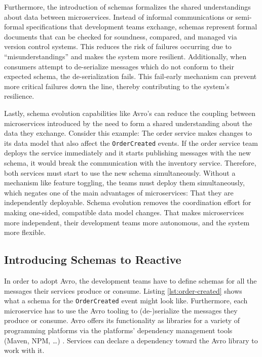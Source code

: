 Furthermore, the introduction of schemas formalizes the shared understandings about data between microservices.
Instead of informal communications or semi-formal specifications that development teams exchange, schemas represent formal documents that can be checked for soundness, compared, and managed via version control systems.
This reduces the risk of failures occurring due to \enquote{misunderstandings} and makes the system more resilient.
Additionally, when consumers attempt to de-serialize messages which do not conform to their expected schema, the de-serialization fails.
This fail-early mechanism can prevent more critical failures down the line, thereby contributing to the system's resilience.

Lastly, schema evolution capabilities like Avro's can reduce the coupling between microservices introduced by the need to form a shared understanding about the data they exchange.
Consider this example: The order service makes changes to its data model that also affect the \texttt{OrderCreated} events.
If the order service team deploys the service immediately and it starts publishing messages with the new schema, it would break the communication with the inventory service.
Therefore, both services must start to use the new schema simultaneously.
Without a mechanism like feature toggling, the teams must deploy them simultaneously, which negates one of the main advantages of microservices: That they are independently deployable.
Schema evolution removes the coordination effort for making one-sided, compatible data model changes.
That makes microservices more independent, their development teams more autonomous, and the system more flexible.

\subsection{Introducing Schemas to Reactive }\label{sec:introducing-schemas}

In order to adopt Avro, the development teams have to define schemas for all the messages their services produce or consume.
Listing \ref{lst:order-created} shows what a schema for the \texttt{OrderCreated} event might look like.
Furthermore, each microservice has to use the Avro tooling to (de-)serialize the messages they produce or consume.
Avro offers its functionality as libraries for a variety of programming platforms via the platforms' dependency management tools (Maven, NPM, \ldots) \parencite{avro}.
Services can declare a dependency toward the Avro library to work with it.

